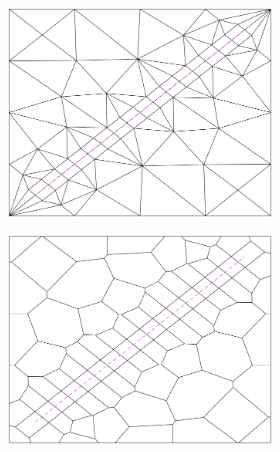 \begin{figure}[htp]
    \centering
    \begin{subfigure}[b]{\textwidth}
        \centering
        \begin{subfigure}[b]{0.35\textwidth}
            \centering
            \includegraphics[width=\textwidth]{report/Images/Combining software/Wells as transfinite grids/cell_constraint_as_transfinite_delaunay_1.png}
        \end{subfigure}
        \begin{subfigure}[b]{0.35\textwidth}
            \centering
            \includegraphics[width=\textwidth]{report/Images/Combining software/Wells as transfinite grids/cell_constraint_as_transfinite_pebi_1.png}

\end{subfigure}
\end{subfigure}
\end{figure}
